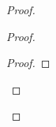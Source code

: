 \begin{proof}
\begin{proof}
\begin{proof}
			
			
			
			
			
			
			
			
			
			
			
			
			

\end{proof}
\end{proof}
\end{proof}
